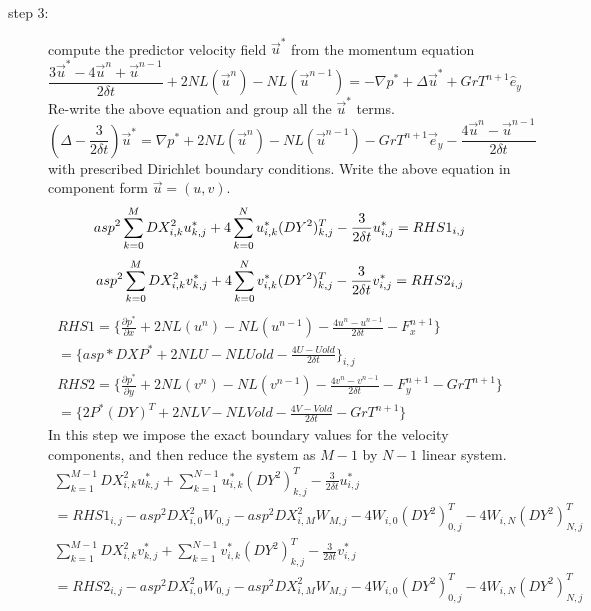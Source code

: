 \documentclass[12pt]{article}
\begin{document}
\begin{description}
\item[step 3:] compute the predictor velocity field $\vec{u}^{*}$ from the momentum equation
\begin{equation}
\frac{3\vec{u}^{*}-4\vec{u}^{n}+\vec{u}^{n-1}}{2\delta t} +2NL(\vec{u}^{n})-NL(\vec{u}^{n-1})
  =-\nabla p^{*}+\Delta \vec{u}^{*}+GrT^{n+1}\hat{e}_{y}
\end{equation}
Re-write the above equation and group all the $\vec{u}^{*}$ terms.
\begin{equation}
(\Delta -\frac{3}{2\delta t})\vec{u}^{*}= \nabla p^{*} + 2NL(\vec{u}^{n}) - NL(\vec{u}^{n-1}) 
  -GrT^{n+1}\vec{e}_{y} - \frac{4\vec{u}^{n}-\vec{u}^{n-1}}{2\delta t}
\end{equation}
with prescribed Dirichlet boundary conditions. Write the above equation in component form $\vec{u}=(u,v)$.\\
\begin{equation}
asp^{2}\sum_{k=0}^{M}DX^{2}_{i,k}u^{*}_{k,j} + 4\sum_{k=0}^{N}u^{*}_{i,k}(DY^{2})^{T}_{k,j}
-\frac{3}{2\delta t}u^{*}_{i,j}= RHS1_{i,j}\\
\end{equation}
\begin{equation}
asp^{2}\sum_{k=0}^{M}DX^{2}_{i,k}v^{*}_{k,j} + 4\sum_{k=0}^{N}v^{*}_{i,k}(DY^{2})^{T}_{k,j}
-\frac{3}{2\delta t}v^{*}_{i,j}= RHS2_{i,j}\\
\end{equation}
\begin{align}
RHS1 = \{ \frac{\partial p^{*}}{\partial x} +2NL(u^{n})-NL(u^{n-1})-
  \frac{4u^{n}-u^{n-1}}{2\delta t} -F^{n+1}_{x}  \}\\
= \{ asp*DXP^{*} +2NLU-NLUold-\frac{4U-Uold}{2\delta t} \}_{i,j}\\
RHS2 = \{ \frac{\partial p^{*}}{\partial y} +2NL(v^{n})-NL(v^{n-1})-
  \frac{4v^{n}-v^{n-1}}{2\delta t} -F^{n+1}_{y} -GrT^{n+1} \}\\
= \{ 2P^{*}(DY)^{T} +2NLV-NLVold-\frac{4V-Vold}{2\delta t} -GrT^{n+1} \}
\end{align}
In this step we impose the exact boundary values for the velocity components, 
and then reduce the system as $M-1$ by $N-1$ linear system.
\begin{multline}
\sum_{k=1}^{M-1}DX^{2}_{i,k}u^{*}_{k,j} + \sum_{k=1}^{N-1}u^{*}_{i,k}(DY^{2})^{T}_{k,j}
-\frac{3}{2\delta t}u^{*}_{i,j}\\
= RHS1_{i,j}-asp^{2}DX^{2}_{i,0}W_{0,j}-asp^{2}DX^{2}_{i,M}W_{M,j}
-4W_{i,0}(DY^{2})^{T}_{0,j}-4W_{i,N}(DY^{2})^{T}_{N,j}
\end{multline}
\begin{multline}
\sum_{k=1}^{M-1}DX^{2}_{i,k}v^{*}_{k,j} + \sum_{k=1}^{N-1}v^{*}_{i,k}(DY^{2})^{T}_{k,j}
-\frac{3}{2\delta t}v^{*}_{i,j}\\
= RHS2_{i,j}-asp^{2}DX^{2}_{i,0}W_{0,j}-asp^{2}DX^{2}_{i,M}W_{M,j}
-4W_{i,0}(DY^{2})^{T}_{0,j}-4W_{i,N}(DY^{2})^{T}_{N,j}\\
\end{multline}


\end{description}
\end{document}
